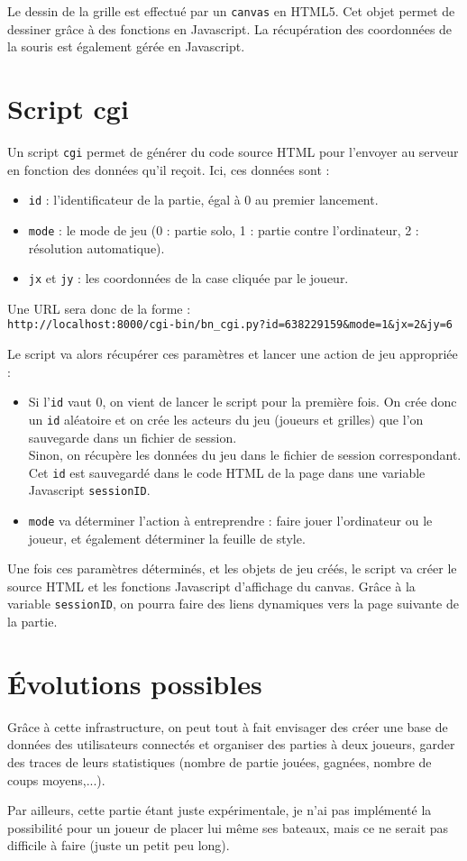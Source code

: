 Le dessin de la grille est effectué par un \texttt{canvas} en HTML5. Cet objet permet de dessiner grâce à des fonctions en Javascript. La récupération des coordonnées de la souris est également gérée en Javascript.

\section{Script cgi}
Un script \texttt{cgi} permet de générer du code source HTML pour l'envoyer au serveur en fonction des données qu'il reçoit. Ici, ces données sont :
\begin{itemize}
\item \texttt{id} : l'identificateur de la partie, égal à 0 au premier lancement.
\item \texttt{mode} : le mode de jeu (0 : partie solo, 1 : partie contre l'ordinateur, 2 : résolution automatique).
\item \texttt{jx} et \texttt{jy} : les coordonnées de la case cliquée par le joueur. 
\end{itemize}
Une URL sera donc de la forme :\\
\texttt{http://localhost:8000/cgi-bin/bn\_cgi.py?id=638229159\&mode=1\&jx=2\&jy=6}

Le script va alors récupérer ces paramètres et lancer une action de jeu appropriée : 
\begin{itemize}
\item Si l'\texttt{id} vaut 0, on vient de lancer le script pour la première fois. On crée donc un \texttt{id} aléatoire et on crée les acteurs du jeu (joueurs et grilles) que l'on sauvegarde dans un fichier de session.\\
Sinon, on récupère les données du jeu dans le fichier de session correspondant.\\
Cet \texttt{id} est sauvegardé dans le code HTML de la page dans une variable Javascript \texttt{sessionID}.
\item \texttt{mode} va déterminer l'action à entreprendre : faire jouer l'ordinateur ou le joueur, et également déterminer la feuille de style.
\end{itemize}

Une fois ces paramètres déterminés, et les objets de jeu créés, le script va créer le source HTML et les fonctions Javascript d'affichage du canvas. Grâce à la variable \texttt{sessionID}, on pourra faire des liens dynamiques vers la page suivante de la partie. 

\section{Évolutions possibles}
Grâce à cette infrastructure, on peut tout à fait envisager des créer une base de données des utilisateurs connectés et organiser des parties à deux joueurs, garder des traces de leurs statistiques (nombre de partie jouées, gagnées, nombre de coups moyens,...).

Par ailleurs, cette partie étant juste expérimentale, je n'ai pas implémenté la possibilité pour un joueur de placer lui même ses bateaux, mais ce ne serait pas difficile à faire (juste un petit peu long). 